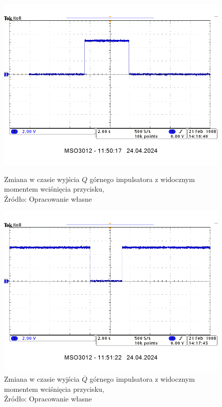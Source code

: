 \documentclass{article}
\begin{document}
      \begin{figure}[!ht]
        \begin{minipage}{.5\textwidth}
            \centering
            \includegraphics[scale=0.35]{grafiki/gora_Q.png}
            \caption{Zmiana w czasie wyjścia $Q$ górnego impulsatora z widocznym momentem wciśnięcia przycisku,
            \\Źródło: Opracowanie własne}
        \end{minipage}
        \begin{minipage}{.5\textwidth}
            \centering
            \includegraphics[scale=0.35]{grafiki/gora_NQ.png} 
            \caption{Zmiana w czasie wyjścia $\overline{Q}$ górnego impulsatora z widocznym momentem wciśnięcia przycisku,
            \\Źródło: Opracowanie własne}
        \end{minipage}
      \end{figure}
\end{document}

